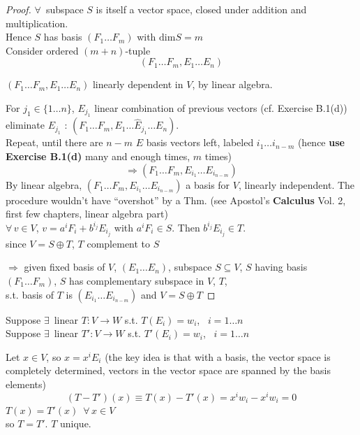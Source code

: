 \begin{proof}
$\forall \, $ subspace $S$ is itself a vector space, closed under addition and multiplication. \\
\phantom{ \quad } Hence $S$ has basis $(F_1 \dots F_m)$ with $\text{dim}S = m$ \\

Consider ordered $(m+n)$-tuple 
\[
(F_1 \dots F_m, E_1 \dots E_n)
\]

$(F_1 \dots F_m, E_1 \dots E_n)$ linearly dependent in $V$, by linear algebra. 

For $j_1 \in \lbrace 1 \dots n \rbrace$, $E_{j_1}$ linear combination of previous vectors (cf. Exercise B.1(d)) \\
\phantom{ \quad } eliminate $E_{j_1}$ : $(F_1 \dots F_m, E_1 \dots \widehat{E}_{j_1} \dots E_n )$. \\

Repeat, until there are $n-m$ $E$ basis vectors left, labeled $i_1 \dots i_{n-m}$ (hence \textbf{use Exercise B.1(d)} many and enough times, $m$ times)
\[
\Longrightarrow (F_1 \dots F_m, E_{i_1} \dots E_{i_{n-m}} )
\]
By linear algebra, $(F_1 \dots F_m, E_{i_1} \dots E_{i_{n-m}})$ a basis for $V$, linearly independent. The procedure wouldn't have ``overshot'' by a Thm. (see Apostol's \textbf{Calculus} Vol. 2, first few chapters, linear algebra part) \\

$\forall \, v\in V$, $v= a^iF_i  + b^{i_j} E_{i_j}$ with $a^i F_i \in S$.  Then $b^{i_j} E_{i_j} \in T$.  \\
\phantom{ \quad } since $V = S\oplus T$, $T$ complement to $S$

$\Longrightarrow $ given fixed basis of $V$, $(E_1 \dots E_n)$, subspace $S \subseteq V$, $S$ having basis $(F_1 \dots F_m)$, $S$ has complementary subspace in $V$, $T$, \\
\phantom{ \quad } s.t. basis of $T$ is $(E_{i_1} \dots E_{i_{n-m}})$ and $V = S\oplus T$

\end{proof}


  Suppose $\exists \, $ linear $T: V \to W $ s.t. $T(E_i) = w_i$, \quad \, $i = 1 \dots n$ \\
Suppose $\exists \, $ linear $T':V \to W$ s.t. $T'(E_i)= w_i$, \quad \, $i = 1 \dots n$

Let $x\in V$, so $x  = x^i E_i$ (the key idea is that with a basis, the vector space is completely determined, vectors in the vector space are spanned by the basis elements)
\[
(T-T')(x) \equiv T(x) - T'(x)  = x^i w_i - x^i w_i = 0
\]
$T(x) = T'(x)$\quad \, $\forall \, x \in V$ \\
so $T=T'$.  $T$ unique.  

